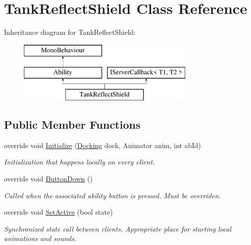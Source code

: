 \hypertarget{class_tank_reflect_shield}{}\section{Tank\+Reflect\+Shield Class Reference}
\label{class_tank_reflect_shield}
Inheritance diagram for Tank\+Reflect\+Shield\+:\begin{figure}[H]
\begin{center}
\leavevmode
\includegraphics[height=3.000000cm]{class_tank_reflect_shield}
\end{center}
\end{figure}
\subsection*{Public Member Functions}
\begin{DoxyCompactItemize}
\item 
override void \hyperlink{class_tank_reflect_shield_a3e2249b4918a8b93ac770d74adf03044}{Initialize} (\hyperlink{class_docking}{Docking} dock, Animator anim, int ab\+Id)
\begin{DoxyCompactList}\small\item\em Initialization that happens locally on every client. \end{DoxyCompactList}\item 
override void \hyperlink{class_tank_reflect_shield_a1f71fd2db71f237e13ff9e0121230f61}{Button\+Down} ()
\begin{DoxyCompactList}\small\item\em Called when the associated ability button is pressed. Must be overriden. \end{DoxyCompactList}\item 
override void \hyperlink{class_tank_reflect_shield_afb401bdb8593e86b44b70bc3eb369a47}{Set\+Active} (bool state)
\begin{DoxyCompactList}\small\item\em Synchronized state call between clients. Appropriate place for starting local animations and sounds. \end{DoxyCompactList}\end{DoxyCompactItemize}
